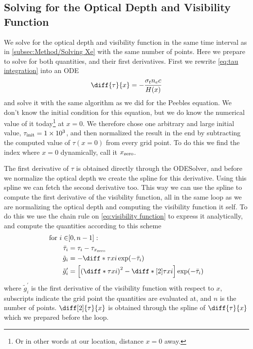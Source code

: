 \documentclass[10pt,a4paper]{article}
\begin{document}
\subsection{Solving for the Optical Depth and Visibility Function}
\label{subsec:method/tau and g}
We solve for the optical depth and visibility function in the same time interval as in \cref{subsec:Method/Solving Xe} with the same number of points. Here we prepare to solve for both quantities, and their first derivatives. First we rewrite \cref{eq:tau integration} into an ODE
\begin{equation}
    \diff{\tau }{x} = -\frac{\sigma_t n_e c}{H(x)}
    \label{eq: tau ODE}
\end{equation}
and solve it with the same algorithm as we did for the Peebles equation. We don't know the initial condition for this equation, but we do know the numerical value of it today\footnote{Or in other words at our location, distance $x=0$ away.} at $x=0$. We therefore chose one arbitrary and large initial value, $\tau_{\rm{init}} = \num{1e3}$, and then normalized the result in the end by subtracting the computed value of $\tau(x=0)$ from every grid point. To do this we find the index where $x=0$ dynamically, call it $x_{\rm{zero}}$.

The first derivative of $\tau$ is obtained directly through the ODESolver, and before we normalize the optical depth we create the spline for this derivative. Using this spline we can fetch the second derivative too. This way we can use the spline to compute the first derivative of the visibility function, all in the same loop as we are normalizing the optical depth and computing the visibility function it self. To do this we use the chain rule on \cref{eq:visibility function} to express it analytically, and compute the quantities according to this scheme
\begin{align*}
    \text{for } i \in &[0,n-1]:
    \\
    \bar{\tau}_i &= \tau_i - \tau_{x_{\rm{zero}}}
    \\
    \tilde{g}_i &= - \diff*{\tau}{x}{i}\exp(-\bar{\tau}_i)
    \\
    \tilde{g}_i^\prime &= \left[\left(\diff*{\tau}{x}{i}\right)^2-\diff*[2]{\tau}{x}{i}\right]\exp(-\bar{\tau}_i)
\end{align*}
where $\tilde{g}_i^\prime$ is the first derivative of the visibility function with respect to $x$, subscripts indicate the grid point the quantities are evaluated at, and $n$ is the number of points. $\diff[2]{\tau}{x}$ is obtained through the spline of $\diff{\tau}{x}$ which we prepared before the loop.
\end{document}
